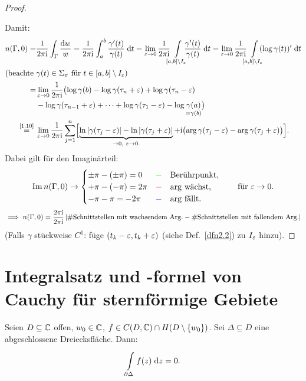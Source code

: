 \documentclass[a4paper,twoside,DIV15,BCOR12mm]{scrbook}
\begin{document}
\begin{proof}
\begin{center}
\end{center}

Damit:
\begin{align*}
n(\Gamma,0) = &\frac{1}{2\pi\i}\int_\Gamma\frac{\d w}{w} =
\frac{1}{2\pi\i}\integral{a}{b}{\frac{\gamma^\prime(t)}{\gamma(t)}}{t} = \lim_{\ep\ra 0}\frac{1}{2\pi\i}\!\!\!\Integral{[a,b]\setminus
  I_\ep}{}{\!\!\!\!\frac{\gamma^\prime(t)}{\gamma(t)}}{t} = \lim_{\ep\ra
  0}\frac{1}{2\pi\i}\!\!\!\Integral{[a,b]\setminus
  I_\ep}{}{\!\!\!\!\!(\log\gamma(t))^\prime}{t} \\
\intertext{(beachte $\gamma(t)\in\Sigma_\pi$ für $t\in[a,b]\setminus I_\ep$)}
=&\lim_{\ep\ra 0}\frac{1}{2\pi\i}\bigl(\log\gamma(b)-\log\gamma(\tau_n+\ep)+\log\gamma(\tau_n-\ep)\\
&-\log\gamma(\tau_{n-1}+\ep)+\dotsb+\log\gamma(\tau_1-\ep)-\log\underset{=\gamma(b)}{\gamma(a)}\bigr)\\
\nach{=}{\eqref{1.10}}&\lim_{\ep\ra0}\frac{1}{2\pi\i}\sum_{j=1}^n\Bigl[\underbrace{\ln\abs{\gamma(\tau_j-\ep)}-\ln\abs{\gamma(\tau_j+\ep)}}_{\ra0,\ \ep\ra0.}+\i\bigl(\arg\gamma(\tau_j-\ep)-\arg\gamma(\tau_j+\ep)\bigr)\Bigr].
\end{align*}
Dabei gilt für den Imaginärteil:
\[\operatorname{Im}{n(\Gamma,0)} \rightarrow\begin{cases}\pm\pi-(\pm\pi) = 0&\text{\textcolor{green}{$-\quad$}Berührpunkt,}\\+\pi-(-\pi) = 2\pi&\text{\textcolor{red}{$-\quad$}$\arg$ wächst,}\\-\pi-\pi=-2\pi&\text{\textcolor{blue}{$-\quad$}$\arg$ fällt.}\end{cases}\qquad\text{für }\varepsilon\rightarrow 0.\]
\[\implies n(\Gamma,0) = \frac{2\pi\mathrm{i}}{2\pi\mathrm{i}}\left\lvert\text{\#Schnittstellen mit wachsendem Arg.} - \text{\#Schnittstellen mit fallendem Arg.}\right\lvert\]
(Falls $\gamma$ stückweise $C^1$: füge $(t_k-\varepsilon,t_k+\varepsilon)$ (siehe Def.~\ref{dfn2.2}) zu $I_\varepsilon$ hinzu).
\end{proof}

\section{Integralsatz und -formel von Cauchy für sternförmige Gebiete}

\begin{satz}\label{satz2.19} Seien $D\subseteq\mathbb{C}$ offen, $w_0\in\mathbb{C}$, $f\in C(D,\mathbb{C})\cap H(D\setminus\{w_0\})$. Sei $\Delta\subseteq D$ eine abgeschlossene Dreiecksfläche. Dann:
\[\int\limits_{\partial\Delta}^{}{f(z)}\;\mathrm{d}z=0.\]
\end{satz}
\end{document}
